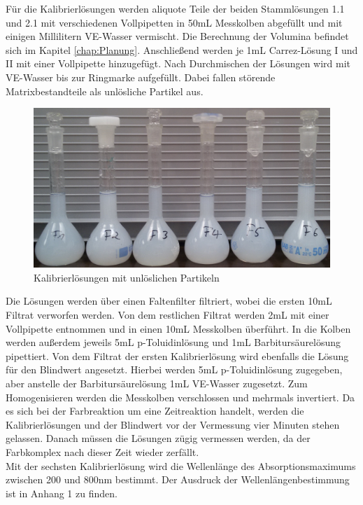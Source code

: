 Für die Kalibrierlösungen werden aliquote Teile der beiden Stammlösungen 1.1 und 2.1 mit verschiedenen Vollpipetten in 50mL Messkolben abgefüllt und mit einigen Millilitern VE-Wasser vermischt. Die Berechnung der Volumina befindet sich im Kapitel \ref{chap:Planung}. Anschließend werden je 1mL Carrez-Lösung I und II mit einer Vollpipette hinzugefügt. Nach Durchmischen der Lösungen wird mit VE-Wasser bis zur Ringmarke aufgefüllt. Dabei fallen störende Matrixbestandteile als unlösliche Partikel aus.\\
\begin{figure}[htbp]
	\centering
		\includegraphics[width=1.00\textwidth]{../Bilder/20150424_155955.jpg}
	\caption{Kalibrierlösungen mit unlöslichen Partikeln}
	\label{fig:Partikel}
\end{figure}
Die Lösungen werden über einen Faltenfilter filtriert, wobei die ersten 10mL Filtrat verworfen werden. Von dem restlichen Filtrat werden 2mL mit einer Vollpipette entnommen und in einen 10mL Messkolben überführt. In die Kolben werden außerdem jeweils 5mL p-Toluidinlösung und 1mL Barbitursäurelösung pipettiert. Von dem Filtrat der ersten Kalibrierlösung wird ebenfalls die Lösung für den Blindwert angesetzt. Hierbei werden 5mL p-Toluidinlösung zugegeben, aber anstelle der Barbitursäurelösung 1mL VE-Wasser zugesetzt. Zum Homogenisieren werden die Messkolben verschlossen und mehrmals invertiert. Da es sich bei der Farbreaktion um eine Zeitreaktion handelt, werden die Kalibrierlösungen und der Blindwert vor der Vermessung vier Minuten stehen gelassen. Danach müssen die Lösungen zügig vermessen werden, da der Farbkomplex nach dieser Zeit wieder zerfällt.\\
Mit der sechsten Kalibrierlösung wird die Wellenlänge des Absorptionsmaximums zwischen 200 und 800nm bestimmt. Der Ausdruck der Wellenlängenbestimmung ist in Anhang 1 zu finden.

